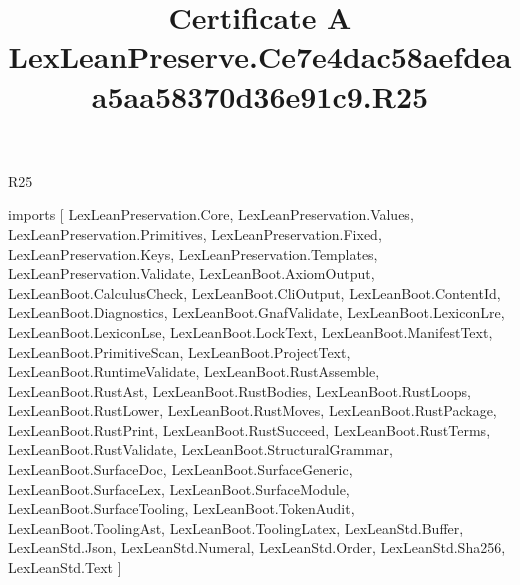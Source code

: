 \begin{lexlean}{R25}
\title{Certificate A LexLeanPreserve.Ce7e4dac58aefdeaa5aa58370d36e91c9.R25}
\begin{coremodule}
imports [
  LexLeanPreservation.Core,
  LexLeanPreservation.Values,
  LexLeanPreservation.Primitives,
  LexLeanPreservation.Fixed,
  LexLeanPreservation.Keys,
  LexLeanPreservation.Templates,
  LexLeanPreservation.Validate,
  LexLeanBoot.AxiomOutput,
  LexLeanBoot.CalculusCheck,
  LexLeanBoot.CliOutput,
  LexLeanBoot.ContentId,
  LexLeanBoot.Diagnostics,
  LexLeanBoot.GnafValidate,
  LexLeanBoot.LexiconLre,
  LexLeanBoot.LexiconLse,
  LexLeanBoot.LockText,
  LexLeanBoot.ManifestText,
  LexLeanBoot.PrimitiveScan,
  LexLeanBoot.ProjectText,
  LexLeanBoot.RuntimeValidate,
  LexLeanBoot.RustAssemble,
  LexLeanBoot.RustAst,
  LexLeanBoot.RustBodies,
  LexLeanBoot.RustLoops,
  LexLeanBoot.RustLower,
  LexLeanBoot.RustMoves,
  LexLeanBoot.RustPackage,
  LexLeanBoot.RustPrint,
  LexLeanBoot.RustSucceed,
  LexLeanBoot.RustTerms,
  LexLeanBoot.RustValidate,
  LexLeanBoot.StructuralGrammar,
  LexLeanBoot.SurfaceDoc,
  LexLeanBoot.SurfaceGeneric,
  LexLeanBoot.SurfaceLex,
  LexLeanBoot.SurfaceModule,
  LexLeanBoot.SurfaceTooling,
  LexLeanBoot.TokenAudit,
  LexLeanBoot.ToolingAst,
  LexLeanBoot.ToolingLatex,
  LexLeanStd.Buffer,
  LexLeanStd.Json,
  LexLeanStd.Numeral,
  LexLeanStd.Order,
  LexLeanStd.Sha256,
  LexLeanStd.Text
]


\end{coremodule}
\end{lexlean}
